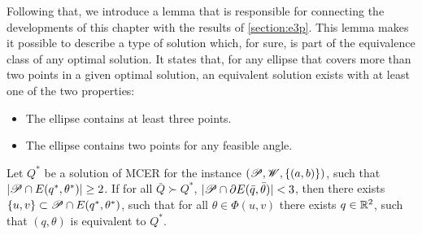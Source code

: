 



Following that, we introduce a lemma that is responsible for connecting the developments of this chapter with the results of \autoref{section:e3p}.
This lemma makes it possible to describe a type of solution which, for sure, is part of the equivalence class of any optimal solution.
It states that, for any ellipse that covers more than two points in a given optimal solution, an equivalent solution exists with at least one of the two properties:
\begin{itemize}
	\item The ellipse contains at least three points.
	\item The ellipse contains two points for any feasible angle.
\end{itemize}


\begin{lem}\label{lema:3pnts}
	Let $Q^*$ be a solution of MCER for the instance $(\mathscr{P}, \mathscr{W}, \{(a, b)\})$, such that $|\mathscr{P} \cap E(q^*, \theta^*)|\ge2$.
	If for all $\bar{Q} \succ Q^*$, $|\mathscr{P} \cap \partial E(\bar{q}, \bar{\theta})| < 3$, then there exists $\{u, v\} \subset \mathscr{P} \cap E(q^*, \theta^*)$, such that for all $\theta\in \Phi(u,v)$ there exists $q \in \mathbb{R}^2$, such that $(q, \theta)$ is equivalent to $Q^*$.
\end{lem}

